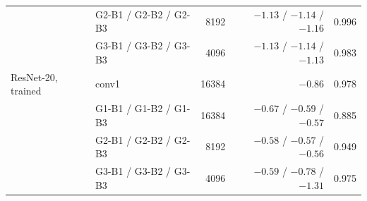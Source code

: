 \begin{tabular}{llrrr}
 & G2-B1 / G2-B2 / G2-B3 & 8192 & $-1.13$ / $-1.14$ / $-1.16$ & 0.996 \\
 & G3-B1 / G3-B2 / G3-B3 & 4096 & $-1.13$ / $-1.14$ / $-1.13$ & 0.983 \\
ResNet-20, trained & conv1 & 16384 & $-0.86$ & 0.978 \\
 & G1-B1 / G1-B2 / G1-B3 & 16384 & $-0.67$ / $-0.59$ / $-0.57$ & 0.885 \\
 & G2-B1 / G2-B2 / G2-B3 & 8192 & $-0.58$ / $-0.57$ / $-0.56$ & 0.949 \\
 & G3-B1 / G3-B2 / G3-B3 & 4096 & $-0.59$ / $-0.78$ / $-1.31$ & 0.975 \\
\bottomrule
\end{tabular}

